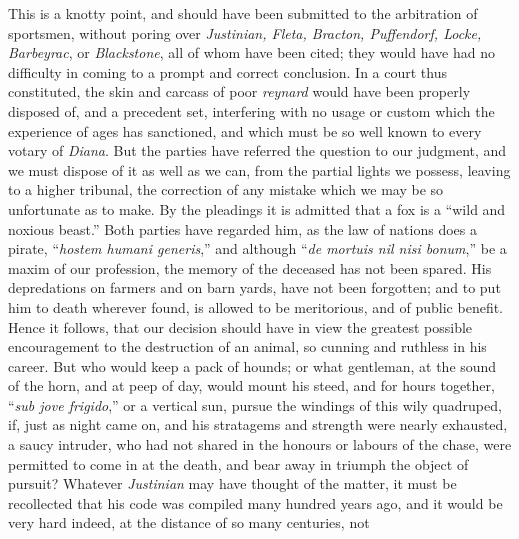 This is a knotty point, and should have been submitted to the arbitration of
sportsmen, without poring over \textit{Justinian, Fleta, Bracton, Puffendorf,
Locke, Barbeyrac}, or \textit{Blackstone}, all of whom have been cited; they
would have had no difficulty in coming to a prompt and correct conclusion. In a
court thus constituted, the skin and carcass of poor
\textit{reynard} would have been properly
disposed of, and a precedent set, interfering with no usage or custom which the
experience of ages has sanctioned, and which must be so well known to every
votary of \textit{Diana}. But the parties have referred the question to our
judgment, and we must dispose of it as well as we can, from the partial lights
we possess, leaving to a higher tribunal, the correction of any mistake which we
may be so unfortunate as to make. By the pleadings it is admitted that a fox is
a ``wild and noxious beast.'' Both parties have regarded him, as the law of
nations does a pirate, ``\textit{hostem humani
generis},'' and although ``\textit{de mortuis nil nisi
bonum},'' be a maxim of our profession, the memory of the
deceased has not been spared. His depredations on farmers and on barn yards,
have not been forgotten; and to put him to death wherever found, is allowed to
be meritorious, and of public benefit. Hence it follows, that our decision
should have in view the greatest possible encouragement to the destruction of an
animal, so cunning and ruthless in his career. But who would keep a pack of
hounds; or what gentleman, at the sound of the horn, and at peep of day, would
mount his steed, and for hours together, ``\textit{sub jove
frigido},'' or a vertical sun, pursue the windings of this wily
quadruped, if, just as night came on, and his stratagems and strength were
nearly exhausted, a saucy intruder, who had not shared in the honours or labours
of the chase, were permitted to come in at the death, and bear away in triumph
the object of pursuit? Whatever \textit{Justinian} may have thought of the
matter, it must be recollected that his code was compiled many hundred years
ago, and it would be very hard indeed, at the distance of so many centuries, not
